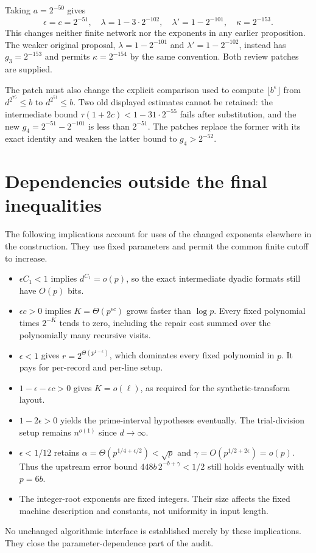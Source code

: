 \documentclass[11pt]{article}
\begin{document}
Taking $a=2^{-50}$ gives
\[
 \epsilon=c=2^{-51},\quad
 \lambda=1-3\cdot2^{-102},\quad \lambda'=1-2^{-101},\quad
 \boxed{\kappa=2^{-153}}.
\]
This changes neither finite network nor the exponents in any earlier
proposition. The weaker original proposal,
$\lambda=1-2^{-101}$ and $\lambda'=1-2^{-102}$, instead has
$g_3=2^{-153}$ and permits $\kappa=2^{-154}$ by the same convention.
Both review patches are supplied.

The patch must also change the explicit comparison used to compute
$\lfloor b^\epsilon\rfloor$ from $d^{2^{75}}\le b$ to
$d^{2^{51}}\le b$. Two old displayed estimates cannot be retained:
the intermediate bound $\tau(1+2c)<1-31\cdot2^{-55}$ fails after
substitution, and the new $g_4=2^{-51}-2^{-101}$ is less than
$2^{-51}$. The patches replace the former with its exact identity and
weaken the latter bound to $g_4>2^{-52}$.

\section{Dependencies outside the final inequalities}
The following implications account for uses of the changed exponents
elsewhere in the construction. They use fixed parameters and permit the
common finite cutoff to increase.
\begin{itemize}
\item $\epsilon C_1<1$ implies $d^{C_1}=o(p)$, so the exact intermediate
dyadic formats still have $O(p)$ bits.
\item $\epsilon c>0$ implies $K=\Theta(p^{\epsilon c})$ grows faster than
$\log p$. Every fixed polynomial times $2^{-K}$ tends to zero, including
the repair cost summed over the polynomially many recursive visits.
\item $\epsilon<1$ gives $r=2^{\Theta(p^{1-\epsilon})}$, which dominates
every fixed polynomial in $p$. It pays for per-record and per-line setup.
\item $1-\epsilon-\epsilon c>0$ gives $K=o(\ell)$, as required for the
synthetic-transform layout.
\item $1-2\epsilon>0$ yields the prime-interval hypotheses eventually.
The trial-division setup remains $n^{o(1)}$ since $d\to\infty$.
\item $\epsilon<1/12$ retains
$\alpha=\Theta(p^{1/4+\epsilon/2})<\sqrt p$ and
$\gamma=O(p^{1/2+2\epsilon})=o(p)$.
Thus the upstream error bound $448b\,2^{-b+\gamma}<1/2$ still holds
eventually with $p=6b$.
\item The integer-root exponents are fixed integers. Their size affects
the fixed machine description and constants, not uniformity in input length.
\end{itemize}
No unchanged algorithmic interface is established merely by these
implications. They close the parameter-dependence part of the audit.
\end{document}
